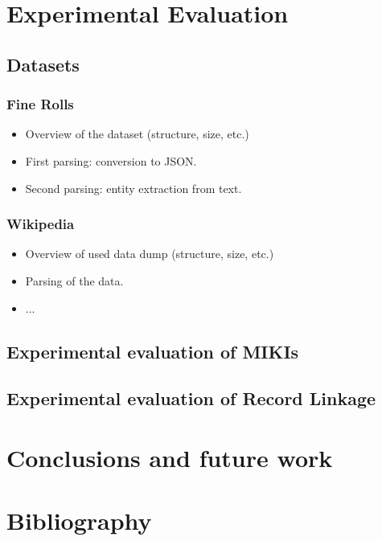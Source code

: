 \documentclass[paper=a4, fontsize=11pt]{scrartcl}					%
\numberwithin{equation}{section}					%
\numberwithin{figure}{section}						%
\numberwithin{table}{section}						%
\begin{document}


\section{Experimental Evaluation}

\subsection{Datasets}

\subsubsection{Fine Rolls}

\begin{itemize}
	\item Overview of the dataset (structure, size, etc.)
	\item First parsing: conversion to JSON.
	\item Second parsing: entity extraction from text.
\end{itemize}


\subsubsection{Wikipedia}
	
\begin{itemize}
	\item Overview of used data dump (structure, size, etc.)
	\item Parsing of the data.
	\item ...
\end{itemize}

\subsection{Experimental evaluation of MIKIs}

\subsection{Experimental evaluation of Record Linkage}




\section{Conclusions and future work}




\section{Bibliography}


\end{document}
